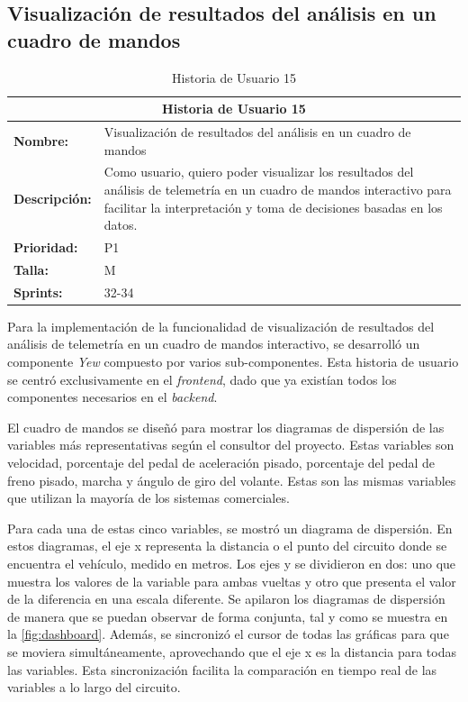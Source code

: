 \subsection{Visualización de resultados del análisis en un cuadro de mandos}
\begin{table}[H]
\centering
\begin{tabular}{|l|p{10cm}|}
\hline
\multicolumn{2}{|c|}{\textbf{Historia de Usuario 15}} \\ \hline
\textbf{Nombre:} & Visualización de resultados del análisis en un cuadro de mandos \\ \hline
\textbf{Descripción:} & Como usuario, quiero poder visualizar los resultados del análisis de telemetría en un cuadro de mandos interactivo para facilitar la interpretación y toma de decisiones basadas en los datos. \\ \hline
\textbf{Prioridad:} & P1 \\ \hline
\textbf{Talla:} & M \\ \hline
\textbf{Sprints:} & 32-34 \\ \hline
\end{tabular}
\caption{Historia de Usuario 15}
\label{tab:visualizacion_resultados_dashboard}
\end{table}

Para la implementación de la funcionalidad de visualización de resultados del análisis de telemetría en un cuadro de mandos interactivo, se desarrolló un componente \textit{Yew} compuesto por varios sub-componentes. Esta historia de usuario se centró exclusivamente en el \textit{frontend}, dado que ya existían todos los componentes necesarios en el \textit{backend}.

El cuadro de mandos se diseñó para mostrar los diagramas de dispersión de las variables más representativas según el consultor del proyecto. Estas variables son velocidad, porcentaje del pedal de aceleración pisado, porcentaje del pedal de freno pisado, marcha y ángulo de giro del volante. Estas son las mismas variables que utilizan la mayoría de los sistemas comerciales.

Para cada una de estas cinco variables, se mostró un diagrama de dispersión. En estos diagramas, el eje x representa la distancia o el punto del circuito donde se encuentra el vehículo, medido en metros. Los ejes y se dividieron en dos: uno que muestra los valores de la variable para ambas vueltas y otro que presenta el valor de la diferencia en una escala diferente. Se apilaron los diagramas de dispersión de manera que se puedan observar de forma conjunta, tal y como se muestra en la \autoref{fig:dashboard}. Además, se sincronizó el cursor de todas las gráficas para que se moviera simultáneamente, aprovechando que el eje x es la distancia para todas las variables. Esta sincronización facilita la comparación en tiempo real de las variables a lo largo del circuito.

